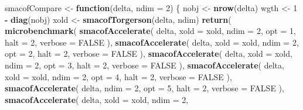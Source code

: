 \documentclass[
  12pt,
]{article}
\newenvironment{Shaded}{\begin{snugshade}}{\end{snugshade}}
\newcommand{\AttributeTok}[1]{\textcolor[rgb]{0.13,0.29,0.53}{#1}}
\newcommand{\ConstantTok}[1]{\textcolor[rgb]{0.56,0.35,0.01}{#1}}
\newcommand{\ControlFlowTok}[1]{\textcolor[rgb]{0.13,0.29,0.53}{\textbf{#1}}}
\newcommand{\DecValTok}[1]{\textcolor[rgb]{0.00,0.00,0.81}{#1}}
\newcommand{\FunctionTok}[1]{\textcolor[rgb]{0.13,0.29,0.53}{\textbf{#1}}}
\newcommand{\NormalTok}[1]{#1}
\newcommand{\OtherTok}[1]{\textcolor[rgb]{0.56,0.35,0.01}{#1}}
\newcommand{\SpecialCharTok}[1]{\textcolor[rgb]{0.81,0.36,0.00}{\textbf{#1}}}
\begin{document}
\begin{Shaded}
\begin{Highlighting}[]
\NormalTok{smacofCompare }\OtherTok{\textless{}{-}} \ControlFlowTok{function}\NormalTok{(delta, }\AttributeTok{ndim =} \DecValTok{2}\NormalTok{) \{}
\NormalTok{  nobj }\OtherTok{\textless{}{-}} \FunctionTok{nrow}\NormalTok{(delta)}
\NormalTok{  wgth }\OtherTok{\textless{}{-}} \DecValTok{1} \SpecialCharTok{{-}} \FunctionTok{diag}\NormalTok{(nobj)}
\NormalTok{  xold }\OtherTok{\textless{}{-}} \FunctionTok{smacofTorgerson}\NormalTok{(delta, ndim)}
  \FunctionTok{return}\NormalTok{(}
    \FunctionTok{microbenchmark}\NormalTok{(}
      \FunctionTok{smacofAccelerate}\NormalTok{(}
\NormalTok{        delta,}
        \AttributeTok{xold =}\NormalTok{ xold,}
        \AttributeTok{ndim =} \DecValTok{2}\NormalTok{,}
        \AttributeTok{opt =} \DecValTok{1}\NormalTok{,}
        \AttributeTok{halt =} \DecValTok{2}\NormalTok{,}
        \AttributeTok{verbose =} \ConstantTok{FALSE}
\NormalTok{      ),}
      \FunctionTok{smacofAccelerate}\NormalTok{(}
\NormalTok{        delta,}
        \AttributeTok{xold =}\NormalTok{ xold,}
        \AttributeTok{ndim =} \DecValTok{2}\NormalTok{,}
        \AttributeTok{opt =} \DecValTok{2}\NormalTok{,}
        \AttributeTok{halt =} \DecValTok{2}\NormalTok{,}
        \AttributeTok{verbose =} \ConstantTok{FALSE}
\NormalTok{      ),}
      \FunctionTok{smacofAccelerate}\NormalTok{(}
\NormalTok{        delta,}
        \AttributeTok{xold =}\NormalTok{ xold,}
        \AttributeTok{ndim =} \DecValTok{2}\NormalTok{,}
        \AttributeTok{opt =} \DecValTok{3}\NormalTok{,}
        \AttributeTok{halt =} \DecValTok{2}\NormalTok{,}
        \AttributeTok{verbose =} \ConstantTok{FALSE}
\NormalTok{      ),}
      \FunctionTok{smacofAccelerate}\NormalTok{(}
\NormalTok{        delta,}
        \AttributeTok{xold =}\NormalTok{ xold,}
        \AttributeTok{ndim =} \DecValTok{2}\NormalTok{,}
        \AttributeTok{opt =} \DecValTok{4}\NormalTok{,}
        \AttributeTok{halt =} \DecValTok{2}\NormalTok{,}
        \AttributeTok{verbose =} \ConstantTok{FALSE}
\NormalTok{      ),}
      \FunctionTok{smacofAccelerate}\NormalTok{(}
\NormalTok{        delta,}
        \AttributeTok{ndim =} \DecValTok{2}\NormalTok{,}
        \AttributeTok{opt =} \DecValTok{5}\NormalTok{,}
        \AttributeTok{halt =} \DecValTok{2}\NormalTok{,}
        \AttributeTok{verbose =} \ConstantTok{FALSE}
\NormalTok{      ),}
      \FunctionTok{smacofAccelerate}\NormalTok{(}
\NormalTok{        delta,}
        \AttributeTok{xold =}\NormalTok{ xold,}
        \AttributeTok{ndim =} \DecValTok{2}\NormalTok{,}

\end{Highlighting}
\end{Shaded}
\end{document}
